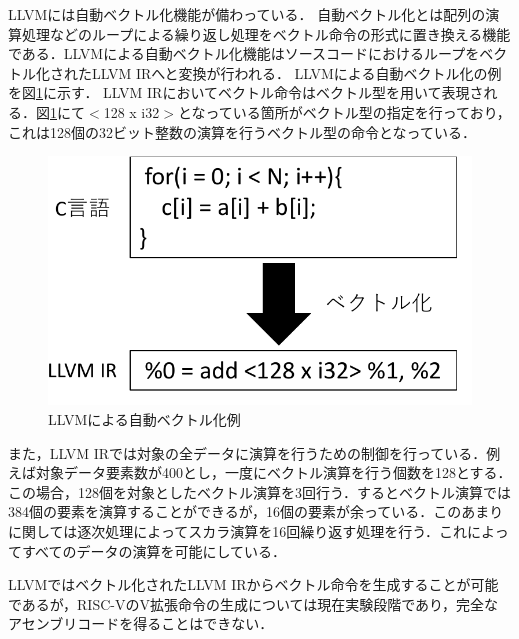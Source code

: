 
LLVMには自動ベクトル化機能が備わっている．
自動ベクトル化とは配列の演算処理などのループによる繰り返し処理をベクトル命令の形式に置き換える機能である．LLVMによる自動ベクトル化機能はソースコードにおけるループをベクトル化されたLLVM IRへと変換が行われる．
LLVMによる自動ベクトル化の例を図\ref{fig:LLVM_auto_vec}に示す．
LLVM IRにおいてベクトル命令はベクトル型を用いて表現される．図\ref{fig:LLVM_auto_vec}にて$<$128 x i32$>$となっている箇所がベクトル型の指定を行っており，これは128個の32ビット整数の演算を行うベクトル型の命令となっている．

\begin{figure}[b]
    \centering
    \includegraphics[scale=0.7]{image/Auto_vectorize.pdf}
    \caption{LLVMによる自動ベクトル化例}
    \label{fig:LLVM_auto_vec}
\end{figure}

また，LLVM IRでは対象の全データに演算を行うための制御を行っている．例えば対象データ要素数が400とし，一度にベクトル演算を行う個数を128とする．この場合，128個を対象としたベクトル演算を3回行う．するとベクトル演算では384個の要素を演算することができるが，16個の要素が余っている．このあまりに関しては逐次処理によってスカラ演算を16回繰り返す処理を行う．これによってすべてのデータの演算を可能にしている．

LLVMではベクトル化されたLLVM IRからベクトル命令を生成することが可能であるが，RISC-VのV拡張命令の生成については現在実験段階であり，完全なアセンブリコードを得ることはできない．